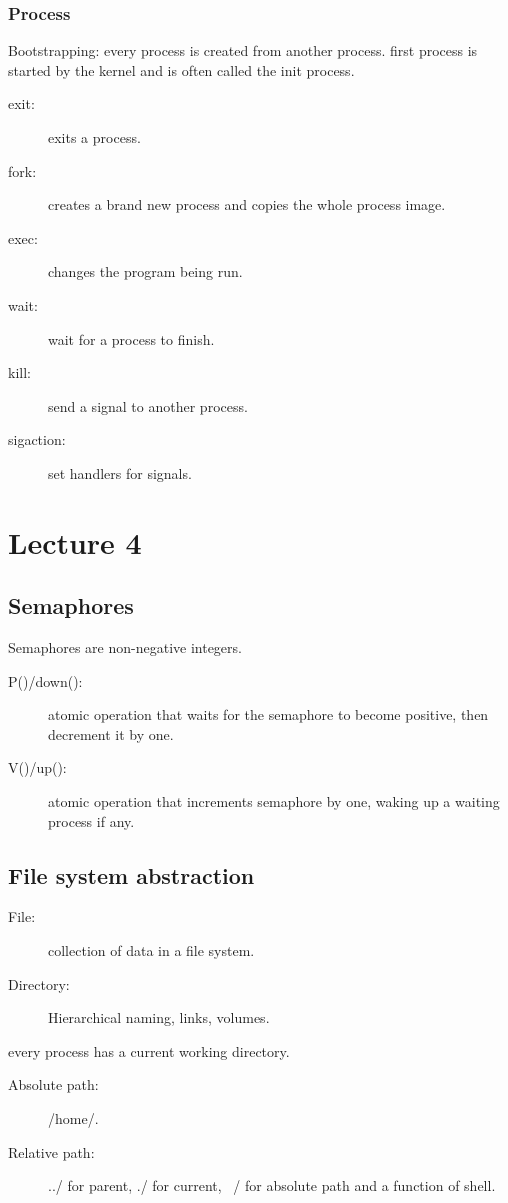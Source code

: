 \subsubsection*{Process}
Bootstrapping: every process is created from another process. first process is started by the kernel and is often called the init process.

\begin{description}
    \item[exit:] exits a process.
    \item[fork:] creates a brand new process and copies the whole process image.
    \item[exec:] changes the program being run.
    \item[wait:] wait for a process to finish.
    \item[kill:] send a signal to another process.
    \item[sigaction:] set handlers for signals.      
\end{description}

\section{Lecture 4}
\subsection{Semaphores}
Semaphores are non-negative integers.
\begin{description}
    \item[P()/down():]  atomic operation that waits for the semaphore to become positive, then decrement it by one.
    \item[V()/up():] atomic operation that increments semaphore by one, waking up a waiting process if any. 
\end{description}
\subsection{File system abstraction}
\begin{description}
    \item[File:] collection of data in a file system. 
    \item[Directory:] Hierarchical naming, links, volumes. 
\end{description}
every process has a current working directory.

\begin{description}
    \item[Absolute path:] /home/.
    \item[Relative path:] ../ for parent, ./ for current, ~/ for absolute path and a function of shell.  
\end{description}

